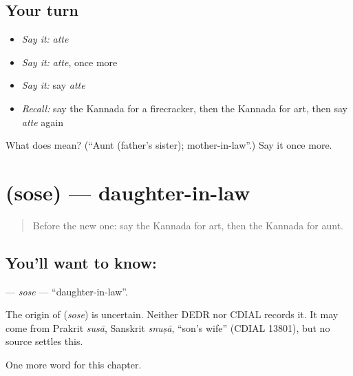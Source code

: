 \subsection*{Your turn}
\begin{itemize}
\raggedright
  \item \emph{Say it:} \emph{atte}
  \item \emph{Say it:} \emph{atte}, once more
  \item \emph{Say it:} say \emph{atte}
  \item \emph{Recall:} say the Kannada for a firecracker, then the Kannada for art, then say \emph{atte} again
\end{itemize}

\begin{tcolorbox}[breakable,colback=teal!4,colframe=teal!35!black,title={Before you move on}]
What does  mean? (\textquotedblleft{}Aunt (father's sister); mother-in-law\textquotedblright{}.) Say it once more.
\end{tcolorbox}
\section[\texorpdfstring{\kn{ಸೊಸೆ} (sose)}{ಸೊಸೆ (sose)}]{ (sose) — daughter-in-law}

\label{lesson:KA-C226-sose}



\begin{quote}
Before the new one: say the Kannada for art, then the Kannada for aunt.
\end{quote}

\subsection*{You'll want to know: }
\textbf{} — \emph{sose} — \textquotedblleft{}daughter-in-law\textquotedblright{}.

\begin{cousinweb}
The origin of \textbf{} (\emph{sose}) is uncertain. Neither DEDR nor CDIAL records it. It may come from Prakrit \emph{susā}, Sanskrit \emph{snuṣā}, \textquotedblleft{}son's wife\textquotedblright{} (CDIAL 13801), but no source settles this.
\end{cousinweb}

\begin{grammarlens}[title={What you've built}]
One more word for this chapter.
\end{grammarlens}

